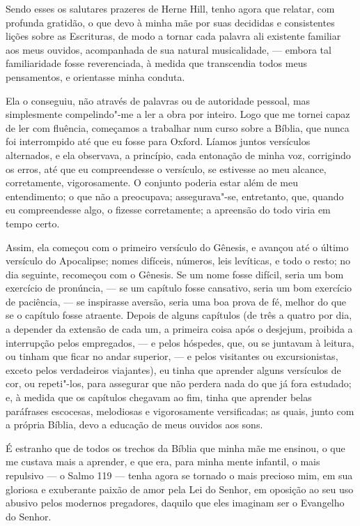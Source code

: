 {{{{{{{{{{{{{%
Sendo esses os salutares prazeres de Herne Hill, tenho agora que
relatar, com profunda gratidão, o que devo à minha mãe por suas
decididas e consistentes lições sobre as Escrituras, de modo a tornar
cada palavra ali existente familiar aos meus ouvidos, acompanhada de sua
natural musicalidade, --- embora tal familiaridade fosse reverenciada, à
medida que transcendia todos meus pensamentos, e orientasse minha
conduta.

Ela o conseguiu, não através de palavras ou de autoridade pessoal, mas
simplesmente compelindo"-me a ler a obra por inteiro. Logo que me tornei
capaz de ler com fluência, começamos a trabalhar num curso sobre a
Bíblia, que nunca foi interrompido até que eu fosse para Oxford. Líamos
juntos versículos alternados, e ela observava, a princípio, cada
entonação de minha voz, corrigindo os erros, até que eu compreendesse o
versículo, se estivesse ao meu alcance, corretamente, vigorosamente. O
conjunto poderia estar além de meu entendimento; o que não a preocupava;
assegurava"-se, entretanto, que, quando eu compreendesse algo, o fizesse
corretamente; a apreensão do todo viria em tempo certo.

Assim, ela começou com o primeiro versículo do Gênesis, e avançou até o
último versículo do Apocalipse; nomes difíceis, números, leis levíticas,
e todo o resto; no dia seguinte, recomeçou com o Gênesis. Se um nome
fosse difícil, seria um bom exercício de pronúncia, --- se um capítulo
fosse cansativo, seria um bom exercício de paciência, --- se inspirasse
aversão, seria uma boa prova de fé, melhor do que se o capítulo fosse
atraente. Depois de alguns capítulos (de três a quatro por dia, a
depender da extensão de cada um, a primeira coisa após o desjejum,
proibida a interrupção pelos empregados, --- e pelos hóspedes, que, ou se
juntavam à leitura, ou tinham que ficar no andar superior, --- e pelos
visitantes ou excursionistas, exceto pelos verdadeiros viajantes), eu
tinha que aprender alguns versículos de cor, ou repeti"-los, para
assegurar que não perdera nada do que já fora estudado; e, à medida que
os capítulos chegavam ao fim, tinha que aprender belas paráfrases
escocesas, melodiosas e vigorosamente versificadas; as quais, junto com
a própria Bíblia, devo a educação de meus ouvidos aos sons.

É estranho que de todos os trechos da Bíblia que minha mãe me ensinou, o
que me custava mais a aprender, e que era, para minha mente infantil, o
mais repulsivo --- o Salmo 119 --- tenha agora se tornado o mais
precioso mim, em sua gloriosa e exuberante paixão de amor pela Lei do
Senhor, em oposição ao seu uso abusivo pelos modernos pregadores,
daquilo que eles imaginam ser o Evangelho do Senhor.

}}}}}}}}}}}}}
